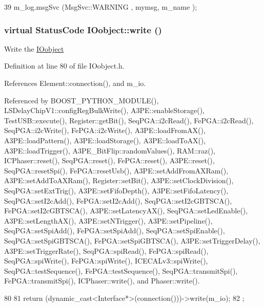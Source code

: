 \begin{DoxyCode}
39 { m_log.msgSvc (MsgSvc::WARNING , mymsg, m_name ); }
\end{DoxyCode}
\hypertarget{classIOobject_a9f6984bc9f0fadcf800f1be2523ac744}{
\subsubsection[{write}]{\setlength{\rightskip}{0pt plus 5cm}virtual {\bf StatusCode} IOobject::write ()}}
\label{classIOobject_a9f6984bc9f0fadcf800f1be2523ac744}
Write the \hyperlink{classIOobject}{IOobject} 

Definition at line 80 of file IOobject.h.

References Element::connection(), and m\_\-io.

Referenced by BOOST\_\-PYTHON\_\-MODULE(), LSDelayChipV1::configRegBulkWrite(), A3PE::enableStorage(), TestUSB::execute(), Register::getBit(), SeqPGA::i2cRead(), FePGA::i2cRead(), SeqPGA::i2cWrite(), FePGA::i2cWrite(), A3PE::loadFromAX(), A3PE::loadPattern(), A3PE::loadStorage(), A3PE::loadToAX(), A3PE::loadTrigger(), A3PE\_\-BitFlip::randomValues(), RAM::raz(), ICPhaser::reset(), SeqPGA::reset(), FePGA::reset(), A3PE::reset(), SeqPGA::resetSpi(), FePGA::resetUsb(), A3PE::setAddFromAXRam(), A3PE::setAddToAXRam(), Register::setBit(), A3PE::setClockDivision(), SeqPGA::setExtTrig(), A3PE::setFifoDepth(), A3PE::setFifoLatency(), SeqPGA::setI2cAdd(), FePGA::setI2cAdd(), SeqPGA::setI2cGBTSCA(), FePGA::setI2cGBTSCA(), A3PE::setLatencyAX(), SeqPGA::setLedEnable(), A3PE::setLengthAX(), A3PE::setNTrigger(), A3PE::setPipeline(), SeqPGA::setSpiAdd(), FePGA::setSpiAdd(), SeqPGA::setSpiEnable(), SeqPGA::setSpiGBTSCA(), FePGA::setSpiGBTSCA(), A3PE::setTriggerDelay(), A3PE::setTriggerRate(), SeqPGA::spiRead(), FePGA::spiRead(), SeqPGA::spiWrite(), FePGA::spiWrite(), ICECALv3::spiWrite(), SeqPGA::testSequence(), FePGA::testSequence(), SeqPGA::transmitSpi(), FePGA::transmitSpi(), ICPhaser::write(), and Phaser::write().


\begin{DoxyCode}
80                              {
81     return (dynamic_cast<Interface*>(connection()))->write(m_io);
82   };
\end{DoxyCode}


